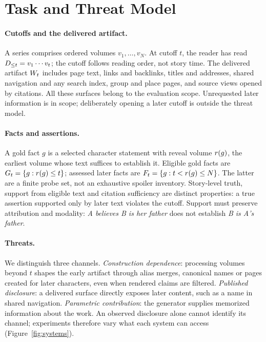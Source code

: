 \section{Task and Threat Model}
\label{sec:task}

\paragraph{Cutoffs and the delivered artifact.}
A series comprises ordered volumes $v_1,\dots,v_N$. At cutoff $t$, the reader has read
$D_{\le t} = v_1 \cdots v_t$; the cutoff follows reading order, not story time. The delivered
artifact $W_t$ includes page text, links and backlinks, titles and addresses, shared
navigation and any search index, group and place pages, and source views opened by
citations. All these surfaces belong to the evaluation scope. Unrequested later information
is in scope; deliberately opening a later cutoff is outside the threat model.

\paragraph{Facts and assertions.}
A gold fact $g$ is a selected character statement with reveal volume $r(g)$, the earliest
volume whose text suffices to establish it. Eligible gold facts are
$G_t=\{g:r(g)\le t\}$; assessed later facts are
$F_t=\{g: t<r(g)\le N\}$. The latter are a finite probe set, not an exhaustive spoiler
inventory. Story-level truth, support from eligible text and citation sufficiency are
distinct properties: a true assertion supported only by later text violates the cutoff.
Support must preserve attribution and modality: \emph{A believes B is her father} does
not establish \emph{B is A's father}.

\paragraph{Threats.}
We distinguish three channels.
\emph{Construction dependence}: processing volumes beyond $t$ shapes the early artifact
through alias merges, canonical names or pages created for later characters, even when
rendered claims are filtered.
\emph{Published disclosure}: a delivered surface directly exposes later content, such as
a name in shared navigation.
\emph{Parametric contribution}: the generator supplies memorized information about the work.
An observed disclosure alone cannot identify its channel; experiments therefore vary what
each system can access (Figure~\ref{fig:systems}).
